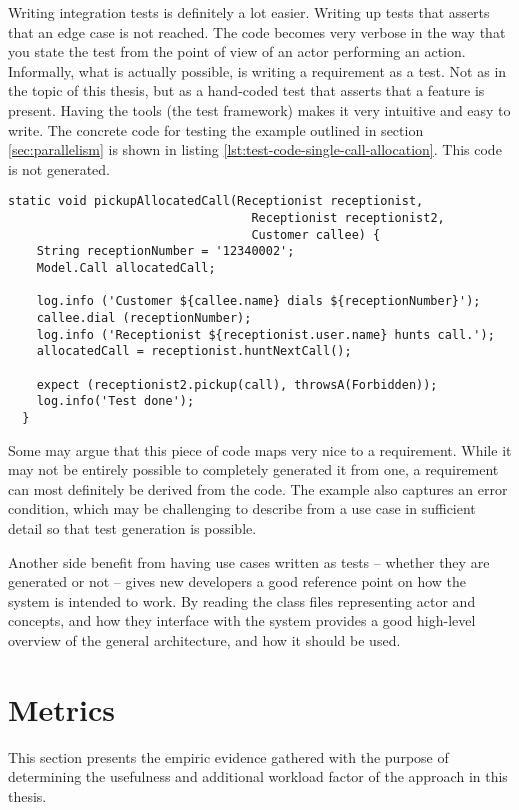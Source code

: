 Writing integration tests is definitely a lot easier. Writing up tests that asserts that an edge case is not reached. The code becomes very verbose in the way that you state the test from the point of view of an actor performing an action. Informally, what is actually possible, is writing a requirement as a test. Not as in the topic of this thesis, but as a hand-coded test that asserts that a feature is present. Having the tools (the test framework) makes it very intuitive and easy to write. The concrete code for testing the example outlined in section \ref{sec:parallelism} is shown in listing \ref{lst:test-code-single-call-allocation}. This code is not generated.
\begin{lstlisting}[style=Dart, caption=Test code for single call allocation,label={lst:test-code-single-call-allocation}]
  static void pickupAllocatedCall(Receptionist receptionist, 
                                  Receptionist receptionist2, 
                                  Customer callee) {
    String receptionNumber = '12340002';
    Model.Call allocatedCall;
    
    log.info ('Customer ${callee.name} dials ${receptionNumber}');
    callee.dial (receptionNumber);
    log.info ('Receptionist ${receptionist.user.name} hunts call.');
    allocatedCall = receptionist.huntNextCall();
   
    expect (receptionist2.pickup(call), throwsA(Forbidden));
    log.info('Test done');
  }
\end{lstlisting}
Some may argue that this piece of code maps very nice to a requirement. While it may not be entirely possible to completely generated it from one, a requirement can most definitely be derived from the code. The example also captures an error condition, which may be challenging to describe from a use case in sufficient detail so that test generation is possible.\medskip

\noindent Another side benefit from having use cases written as tests -- whether they are generated or not -- gives new developers a good reference point on how the system is intended to work. By reading the class files representing actor and concepts, and how they interface with the system provides a good high-level overview of the general architecture, and how it should be used.


\section{Metrics}
This section presents the empiric evidence gathered with the purpose of determining the usefulness and additional workload factor of the approach in this thesis.
